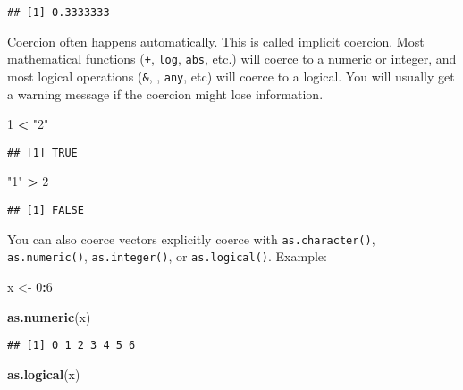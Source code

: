 \documentclass[
]{book}
\newenvironment{Shaded}{\begin{snugshade}}{\end{snugshade}}
\newcommand{\DecValTok}[1]{\textcolor[rgb]{0.00,0.00,0.81}{#1}}
\newcommand{\KeywordTok}[1]{\textcolor[rgb]{0.13,0.29,0.53}{\textbf{#1}}}
\newcommand{\NormalTok}[1]{#1}
\newcommand{\OperatorTok}[1]{\textcolor[rgb]{0.81,0.36,0.00}{\textbf{#1}}}
\newcommand{\StringTok}[1]{\textcolor[rgb]{0.31,0.60,0.02}{#1}}
\begin{document}
\begin{verbatim}
## [1] 0.3333333
\end{verbatim}

Coercion often happens automatically. This is called implicit coercion. Most mathematical functions (\texttt{+}, \texttt{log}, \texttt{abs}, etc.) will coerce to a numeric or integer, and most logical operations (\texttt{\&}, \texttt{\textbar{}}, \texttt{any}, etc) will coerce to a logical. You will usually get a warning message if the coercion might lose information.

\begin{Shaded}
\begin{Highlighting}[]
\DecValTok{1} \OperatorTok{\textless{}}\StringTok{ "2"}
\end{Highlighting}
\end{Shaded}

\begin{verbatim}
## [1] TRUE
\end{verbatim}

\begin{Shaded}
\begin{Highlighting}[]
\StringTok{"1"} \OperatorTok{\textgreater{}}\StringTok{ }\DecValTok{2}
\end{Highlighting}
\end{Shaded}

\begin{verbatim}
## [1] FALSE
\end{verbatim}

You can also coerce vectors explicitly coerce with \texttt{as.character()}, \texttt{as.numeric()}, \texttt{as.integer()}, or \texttt{as.logical()}. Example:

\begin{Shaded}
\begin{Highlighting}[]
\NormalTok{x \textless{}{-}}\StringTok{ }\DecValTok{0}\OperatorTok{:}\DecValTok{6}

\KeywordTok{as.numeric}\NormalTok{(x)}
\end{Highlighting}
\end{Shaded}

\begin{verbatim}
## [1] 0 1 2 3 4 5 6
\end{verbatim}

\begin{Shaded}
\begin{Highlighting}[]
\KeywordTok{as.logical}\NormalTok{(x)}
\end{Highlighting}
\end{Shaded}
\end{document}
